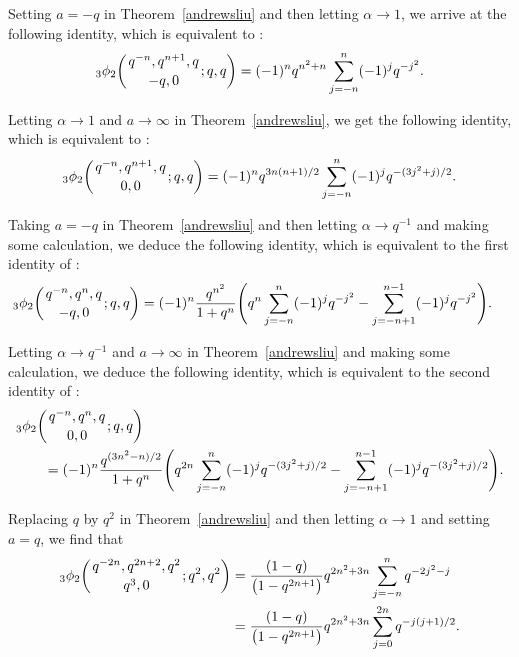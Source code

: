 \documentclass[pdftex]{sigma}
\numberwithin{equation}{section}
\begin{document}
Setting $a=-q$ in Theorem~\ref{andrewsliu} and then letting $\alpha \to 1$, we arrive at the following identity, which is equivalent to
\cite[equation~(6.1)]{Liu2013RamanJ}:
\begin{equation}\label{spvalue:eqn3}
{_3\phi_2}\biggl({{q^{-n}, q^{n+1},q}\atop{-q, 0}}; q, q\biggr)
=(-1)^n q^{n^2+n}\sum_{j=-n}^n (-1)^j q^{-j^2}.
\end{equation}

Letting $\alpha \to 1$ and $a \to \infty$ in Theorem~\ref{andrewsliu}, we get the following identity, which is equivalent to \cite[equation~(6.2)]{Liu2013RamanJ}:
\begin{equation*}%
	{_3\phi_2}\biggl({{q^{-n}, q^{n+1},q}\atop{0, 0}}; q, q\biggr)
	=(-1)^n q^{3n(n+1)/2}\sum_{j=-n}^n (-1)^j q^{-{(3j^2+j)/2}}.
\end{equation*}

Taking $a=-q$ in Theorem~\ref{andrewsliu} and then letting $\alpha \to q^{-1}$ and making some calculation, we deduce the following identity, which is equivalent to the first identity of \cite[Lemma~6.1]{Liu2013RamanJ}:
\begin{align}\label{spvalue:eqn5}
	&{_3\phi_2}\biggl({{q^{-n}, q^{n},q}\atop{-q, 0}}; q, q\biggr)
=(-1)^n\frac{q^{n^2}}{1+q^n} \Biggl(q^n \sum_{j=-n}^n (-1)^j q^{-j^2}-\sum_{j={-n+1}}^{n-1} (-1)^j q^{-j^2}\Biggr).
\end{align}

Letting $\alpha \to q^{-1}$ and $a \to \infty$ in Theorem~\ref{andrewsliu} and making some calculation, we deduce the following identity, which is equivalent to the second identity of \cite[Lemma~6.1]{Liu2013RamanJ}:
\begin{align}
	&{_3\phi_2}\biggl({{q^{-n}, q^{n},q}\atop{0, 0}}; q, q\biggr)\nonumber\\
	&\qquad{}=(-1)^n\frac{q^{(3n^2-n)/2}}{1+q^n} \Biggl({ q^{2n}} \sum_{j=-n}^n (-1)^j q^{-(3j^2+j)/2}-\sum_{j={-n+1}}^{n-1} (-1)^j q^{-(3j^2+j)/2}\Biggr).\label{spvalue:eqn6}
\end{align}



Replacing $q$ by $q^2$ in Theorem~\ref{andrewsliu} and then letting $\alpha \to 1$ and setting $a=q$, we find that
\begin{align}
{_3\phi_2}\biggl({{q^{-2n}, q^{2n+2},q^2}\atop{q^3, 0}}; q^2, q^2\biggr)
&{}=\frac{(1-q)}{\bigl(1-q^{2n+1}\bigr)} q^{2n^2+3n}\sum_{j=-n}^{n} q^{-2j^2-j}	\nonumber\\
&{}={ \frac{(1-q)}{\bigl(1-q^{2n+1}\bigr)} q^{2n^2+3n}\sum_{j=0}^{2n} q^{-j(j+1)/2}.}\label{spvalue:eqn7}
\end{align}	
\end{document}
